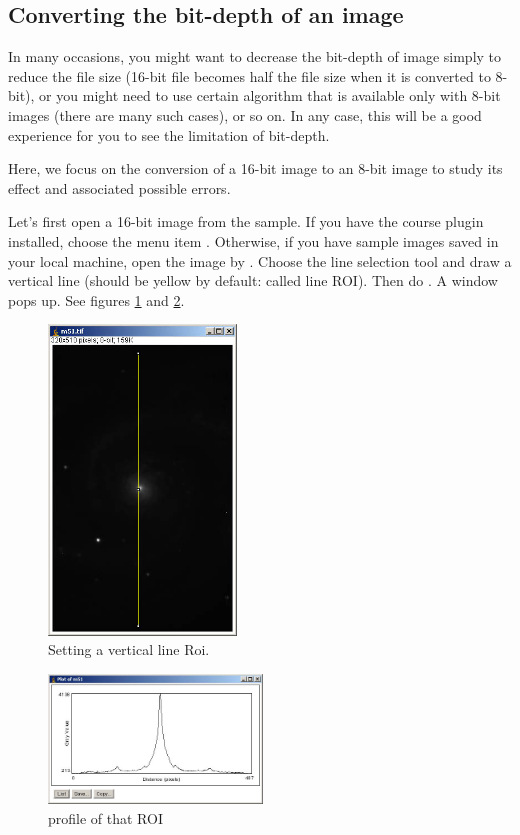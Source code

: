 \subsection{Converting the bit-depth of an image}

In many occasions, you might want to decrease the bit-depth of image
simply to reduce the file size (16-bit file becomes half the file size
when it is converted to 8-bit), or you might need to use certain
algorithm that is available only with 8-bit images (there are many such
cases), or so on. In any case, this will be a good experience for you
to see the limitation of bit-depth.

Here, we focus on the conversion of a 16-bit image to an 8-bit image to
study its effect and associated possible errors. 


\begin{indentexercise}{1}
Let's first open a 16-bit image from the sample. 
If you have the course plugin installed, choose the menu item . Otherwise, if you have sample images saved in your local machine, open the image by . Choose the line selection tool and draw a vertical line 
(should be yellow by default: called line ROI). Then do . 
A window pops up. See figures \ref{fig:img6} and \ref{fig:img7}.

\begin{figure}[htbp]
\begin{center}
\includegraphics[width=5cm]{fig/CMCIBasicCourse201102-img6.jpg}
\caption{Setting a vertical line Roi.}
\label{fig:img6}
\end{center}
\end{figure}

\begin{figure}[htbp]
\begin{center}
\includegraphics[width=5.694cm,height=3.44cm]{fig/CMCIBasicCourse201102-img7.jpg}
\caption{profile of that ROI}
\label{fig:img7}
\end{center}
\end{figure}


\end{indentexercise}
